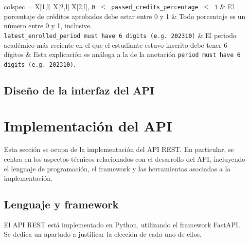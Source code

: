 \begin{longtblr}[
		caption = {Anotaciones del diagrama de clases y su significado},
		label = {tab:anotaciones},
	]{
		colspec = {X[1,l] X[2,l] X[2,l]},
	}
	\texttt{0 \ensuremath{\leq} passed\_credits\_percentage \ensuremath{\leq} 1} & El porcentaje de créditos aprobados debe estar entre 0 y 1                                                                 & Todo porcentaje es un número entre 0 y 1, inclusive.                                                                                                                                                                                                               \\
	\texttt{latest\_enrolled\_period must have 6 digits (e.g. 202310)}           & El periodo académico más reciente en el que el estudiante estuvo inscrito debe tener 6 dígitos                             & Esta explicación es análoga a la de la anotación \texttt{period must have 6 digits (e.g. 202310)}.                                                                                                                                                                 \\
	\hline
\end{longtblr}

\subsection{Diseño de la interfaz del API}


\section{Implementación del API}

Esta sección se ocupa de la implementación del API REST. En particular, se centra en los aspectos técnicos relacionados con el desarrollo del API, incluyendo el lenguaje de programación, el framework y las herramientas asociadas a la implementación.

\subsection{Lenguaje y framework}

El API REST está implementado en Python, utilizando el framework FastAPI. Se dedica un apartado a justificar la elección de cada uno de ellos.

